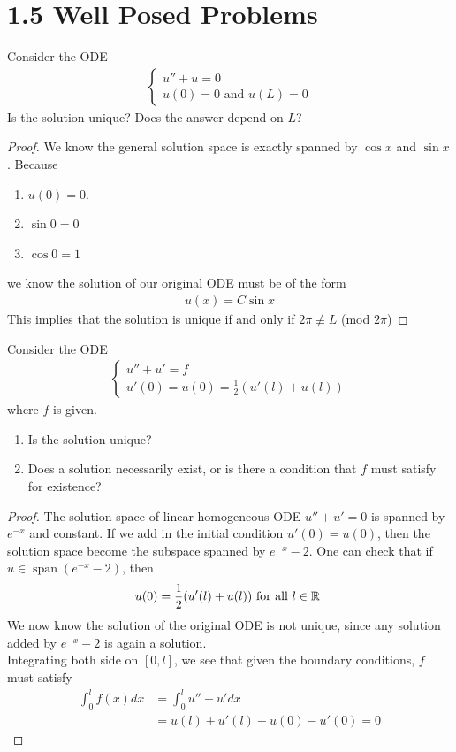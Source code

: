 \documentclass{report}
\begin{document}
\section{1.5 Well Posed Problems}
\begin{question}{}{}
Consider the ODE
\begin{align*}
\begin{cases}
  u''+u=0\\
  u(0)=0\text{ and }u(L)=0
\end{cases} 
\end{align*}
Is the solution unique? Does the answer depend on $L$? 
\end{question}
\begin{proof}
We know the general solution space is exactly spanned by $\cos x$ and $\sin x$. Because 
\begin{enumerate}[label=(\alph*)]
  \item $u(0)=0$.
  \item $\sin 0=0$
  \item $\cos 0=1$
\end{enumerate}
we know the solution of our original ODE must be of the form 
\begin{align*}
u(x)=C \sin x
\end{align*}
This implies that the solution is unique if and only if $2\pi \not\equiv L$ (mod $2\pi$)
\end{proof}
\begin{question}{}{}
Consider the ODE 
\begin{align*}
\begin{cases}
  u''+u'=f \\
  u'(0)=u(0)=\frac{1}{2}(u'(l)+u(l))
\end{cases}
\end{align*}
where $f$ is given. 
\begin{enumerate}[label=(\alph*)]
  \item Is the solution unique? 
  \item Does a solution necessarily exist, or is there a condition that $f$ must satisfy for existence? 
\end{enumerate}
\end{question}
\begin{proof}
The solution space of linear homogeneous ODE $u''+u'=0$  is spanned by $e^{-x}$ and constant. If we add in the initial condition  $u'(0)=u(0)$, then the solution space become the subspace spanned by $e^{-x}-2$. One can check that if $u \in\operatorname{span}(e^{-x}-2)$, then 
\begin{align*}
u(0)=\frac{1}{2}(u'(l)+u(l))\text{ for all $l\in\mathbb{R}$ }
\end{align*}
We now know the solution of the original ODE is not unique, since any solution added by $e^{-x}-2$ is again a solution. \\

Integrating both side on $[0,l]$, we see that given the boundary conditions, $f$ must satisfy 
\begin{align*}
\int_0^l f(x)dx&=\int_0^l u''+u'dx\\
&=u(l)+u'(l)-u(0)-u'(0)=0
\end{align*}
\end{proof}
\end{document}
